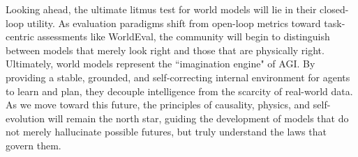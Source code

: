 \documentclass[pdflatex,sn-mathphys-num]{sn-jnl}
\theoremstyle{thmstyleone}%
\theoremstyle{thmstyletwo}%
\theoremstyle{thmstylethree}%
\begin{document}
Looking ahead, the ultimate litmus test for world models will lie in their closed-loop utility. As evaluation paradigms shift from open-loop metrics toward task-centric assessments like WorldEval, the community will begin to distinguish between models that merely look right and those that are physically right. Ultimately, world models represent the ``imagination engine" of AGI. By providing a stable, grounded, and self-correcting internal environment for agents to learn and plan, they decouple intelligence from the scarcity of real-world data. As we move toward this future, the principles of causality, physics, and self-evolution will remain the north star, guiding the development of models that do not merely hallucinate possible futures, but truly understand the laws that govern them.

% 
\end{document}
